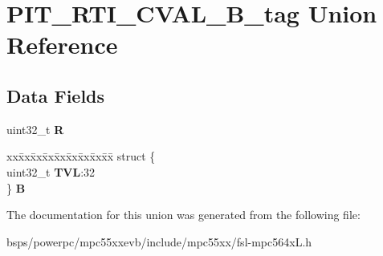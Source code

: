 \hypertarget{unionPIT__RTI__CVAL__32B__tag}{}\section{P\+I\+T\+\_\+\+R\+T\+I\+\_\+\+C\+V\+A\+L\+\_\+B\+\_\+tag Union Reference}
\label{unionPIT__RTI__CVAL__32B__tag}
\subsection*{Data Fields}
\begin{DoxyCompactItemize}
\item 
\mbox{\label{unionPIT__RTI__CVAL__32B__tag_aad07beff02dc075c5018ddc976bd9205}} 
uint32\+\_\+t {\bfseries R}
\item 
\mbox{\label{unionPIT__RTI__CVAL__32B__tag_ac19a2c62fd9f7c6996731fe5fca92c5b}} 
\begin{tabbing}
xx\=xx\=xx\=xx\=xx\=xx\=xx\=xx\=xx\=\kill
struct \{\\
\>uint32\_t {\bfseries TVL}:32\\
\} {\bfseries B}\\

\end{tabbing}\end{DoxyCompactItemize}


The documentation for this union was generated from the following file\+:\begin{DoxyCompactItemize}
\item 
bsps/powerpc/mpc55xxevb/include/mpc55xx/fsl-\/mpc564x\+L.\+h\end{DoxyCompactItemize}
